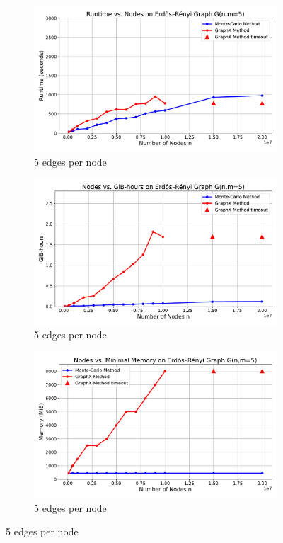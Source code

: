 \begin{figure}[H]
    \centering
    \begin{subfigure}[t]{0.47\linewidth}
        \centering
        \includegraphics[width=\linewidth]{images/plots/ER_5edg/runtime_vs_nodes_er_graph_5_edges.pdf}
        \caption{5 edges per node}
        \label{fig:5run}
    \end{subfigure}
    \begin{subfigure}[t]{0.47\linewidth}
        \centering
        \includegraphics[width=\linewidth]{images/plots/ER_5edg/gbhrs_nodes_er_graph_5edges.pdf}
        \caption{5 edges per node}
        \label{fig:5cost}
    \end{subfigure}
    \begin{subfigure}[t]{0.47\linewidth}
        \centering
        \includegraphics[width=\linewidth]{images/plots/ER_5edg/nodes_vs_mvm_5edges.pdf}
        \caption{5 edges per node}
        \label{fig:5mvm}
    \end{subfigure}
\end{figure}

